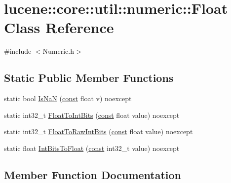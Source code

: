 \hypertarget{classlucene_1_1core_1_1util_1_1numeric_1_1Float}{}\section{lucene\+:\+:core\+:\+:util\+:\+:numeric\+:\+:Float Class Reference}
\label{classlucene_1_1core_1_1util_1_1numeric_1_1Float}


{\ttfamily \#include $<$Numeric.\+h$>$}

\subsection*{Static Public Member Functions}
\begin{DoxyCompactItemize}
\item 
static bool \mbox{\hyperlink{classlucene_1_1core_1_1util_1_1numeric_1_1Float_ae328b61754f252fe9a40c65b26162d5b}{Is\+NaN}} (\mbox{\hyperlink{ZlibCrc32_8h_a2c212835823e3c54a8ab6d95c652660e}{const}} float v) noexcept
\item 
static int32\+\_\+t \mbox{\hyperlink{classlucene_1_1core_1_1util_1_1numeric_1_1Float_a31c32c03ea1cdc51385dec5a72889c62}{Float\+To\+Int\+Bits}} (\mbox{\hyperlink{ZlibCrc32_8h_a2c212835823e3c54a8ab6d95c652660e}{const}} float value) noexcept
\item 
static int32\+\_\+t \mbox{\hyperlink{classlucene_1_1core_1_1util_1_1numeric_1_1Float_ac73cdb781ed72d155cacf4e8a4fa4ecb}{Float\+To\+Raw\+Int\+Bits}} (\mbox{\hyperlink{ZlibCrc32_8h_a2c212835823e3c54a8ab6d95c652660e}{const}} float value) noexcept
\item 
static float \mbox{\hyperlink{classlucene_1_1core_1_1util_1_1numeric_1_1Float_aca55501557a1c47bb91659186cb7168e}{Int\+Bits\+To\+Float}} (\mbox{\hyperlink{ZlibCrc32_8h_a2c212835823e3c54a8ab6d95c652660e}{const}} int32\+\_\+t value) noexcept
\end{DoxyCompactItemize}


\subsection{Member Function Documentation}
\mbox{\label{classlucene_1_1core_1_1util_1_1numeric_1_1Float_a31c32c03ea1cdc51385dec5a72889c62}} 
